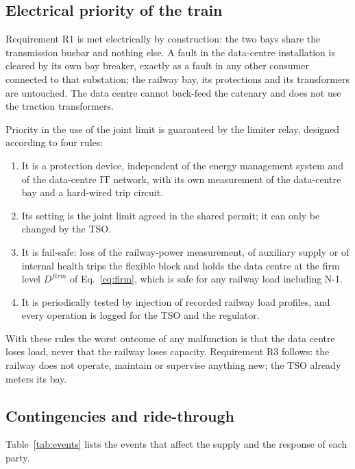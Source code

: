 \subsection{Electrical priority of the train}

Requirement R1 is met electrically by construction: the two bays share the transmission busbar and nothing else. A fault in the data-centre installation is cleared by its own bay breaker, exactly as a fault in any other consumer connected to that substation; the railway bay, its protections and its transformers are untouched. The data centre cannot back-feed the catenary and does not use the traction transformers.

Priority in the use of the joint limit is guaranteed by the limiter relay, designed according to four rules:
\begin{enumerate}
\item It is a protection device, independent of the energy management system and of the data-centre IT network, with its own measurement of the data-centre bay and a hard-wired trip circuit.
\item Its setting is the joint limit agreed in the shared permit; it can only be changed by the TSO.
\item It is fail-safe: loss of the railway-power measurement, of auxiliary supply or of internal health trips the flexible block and holds the data centre at the firm level $D^{firm}$ of Eq.~\eqref{eq:firm}, which is safe for any railway load including N-1.
\item It is periodically tested by injection of recorded railway load profiles, and every operation is logged for the TSO and the regulator.
\end{enumerate}
With these rules the worst outcome of any malfunction is that the data centre loses load, never that the railway loses capacity. Requirement R3 follows: the railway does not operate, maintain or supervise anything new; the TSO already meters its bay.

\subsection{Contingencies and ride-through}

Table~\ref{tab:events} lists the events that affect the supply and the response of each party.

